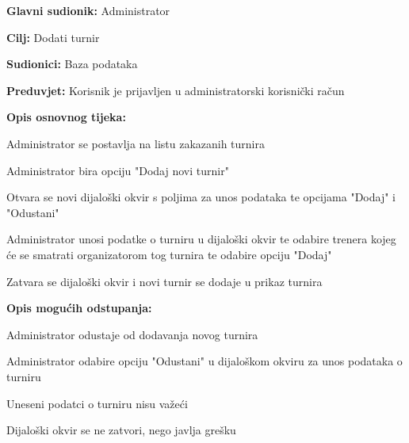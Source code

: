 		\noindent {}
		\begin{packed_item}
			
			\item \textbf{Glavni sudionik: } Administrator
			\item  \textbf{Cilj: } Dodati turnir
			\item  \textbf{Sudionici: } Baza podataka
			\item  \textbf{Preduvjet: } Korisnik je prijavljen u administratorski korisnički račun
			\item  \textbf{Opis osnovnog tijeka:}
			
			\item[] \begin{packed_enum}
				
				\item Administrator se postavlja na listu zakazanih turnira
				\item Administrator bira opciju "Dodaj novi turnir"
				\item Otvara se novi dijaloški okvir s poljima za unos podataka te opcijama "Dodaj" i "Odustani"
				\item Administrator unosi podatke o turniru u dijaloški okvir te odabire trenera kojeg će se smatrati organizatorom tog turnira te odabire opciju "Dodaj"
				\item Zatvara se dijaloški okvir i novi turnir se dodaje u prikaz turnira
			\end{packed_enum}
			
			\item  \textbf{Opis mogućih odstupanja:}
			
			\item[] \begin{packed_item}
				
				\item[3.a] Administrator odustaje od dodavanja novog turnira
				\item[] \begin{packed_enum}
					
					\item Administrator odabire opciju "Odustani" u dijaloškom okviru za unos podataka o turniru
					
				\end{packed_enum}
				\item[3.b] Uneseni podatci o turniru nisu važeći
				\item[] \begin{packed_enum}
					
					\item Dijaloški okvir se ne zatvori, nego javlja grešku
					
				\end{packed_enum}
			\end{packed_item}
			
		\end{packed_item}
		\eject
	
